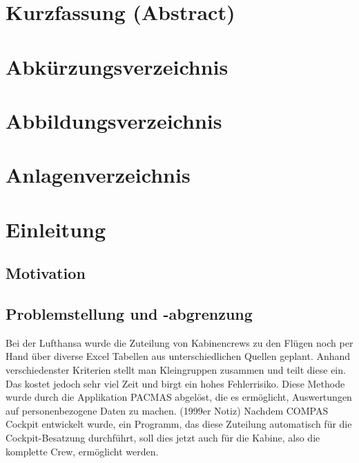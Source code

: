 \documentclass [12pt, a4paper, oneside, titlepage, ngerman]{article}
\begin{document}
\tableofcontents
\newpage


\section*{Kurzfassung (Abstract)}
\newpage

\section*{Abkürzungsverzeichnis}
\newpage

\section*{Abbildungsverzeichnis}
\newpage

\section*{Anlagenverzeichnis}
\newpage

\setcounter{page}{1}
\section{Einleitung }
\subsection {Motivation}

\subsection {Problemstellung und -abgrenzung}
Bei der Lufthansa wurde die Zuteilung von Kabinencrews zu den Flügen noch per Hand über diverse Excel Tabellen aus unterschiedlichen Quellen geplant. Anhand verschiedenster Kriterien stellt man Kleingruppen zusammen und teilt diese ein. Das kostet jedoch sehr viel Zeit und birgt ein hohes Fehlerrisiko.
Diese Methode wurde durch die {\color{red} Applikation PACMAS abgelöst, die  es ermöglicht, Auswertungen auf personenbezogene Daten zu machen. (1999er Notiz)}
Nachdem COMPAS Cockpit entwickelt wurde, ein Programm, das diese Zuteilung automatisch für die Cockpit-Besatzung durchführt, soll dies jetzt auch für die Kabine, also die komplette Crew, ermöglicht werden. 
\end{document}
